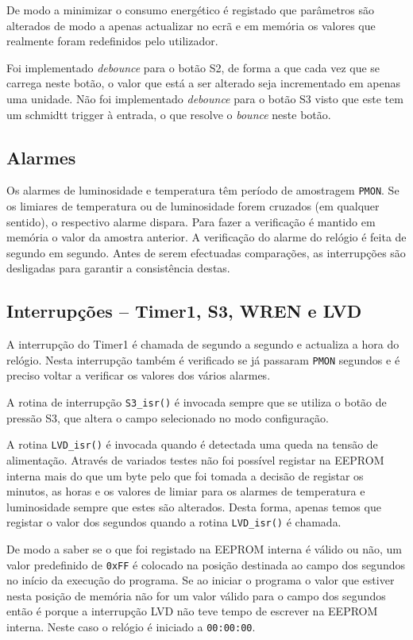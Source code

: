\documentclass[a4paper,12pt]{article}
\begin{document}
De modo a minimizar o consumo energético é registado que parâmetros são alterados de modo a apenas actualizar no ecrã e em memória os valores que realmente foram redefinidos pelo utilizador.

Foi implementado \textit{debounce} para o botão S2, de forma a que cada vez que se carrega neste botão, o valor que está a ser alterado seja incrementado em apenas uma unidade. Não foi implementado \textit{debounce} para o botão S3 visto que este tem um schmidtt trigger à entrada, o que resolve o \textit{bounce} neste botão.


\subsection{Alarmes}

Os alarmes de luminosidade e temperatura têm período de amostragem \texttt{PMON}. Se os limiares de temperatura ou de luminosidade forem cruzados (em qualquer sentido), o respectivo alarme dispara. Para fazer a verificação é mantido em memória o valor da amostra anterior.
A verificação do alarme do relógio é feita de segundo em segundo. Antes de serem efectuadas comparações, as interrupções são desligadas para garantir a consistência destas.

\subsection{Interrupções -- Timer1, S3, WREN e LVD}

A interrupção do Timer1 é chamada de segundo a segundo e actualiza a hora do relógio. Nesta interrupção também é verificado se já passaram \texttt{PMON} segundos e é preciso voltar a verificar os valores dos vários alarmes.

A rotina de interrupção \texttt{S3\_isr()} é invocada sempre que se utiliza o botão de pressão S3, que altera o campo selecionado no modo configuração.

A rotina \texttt{LVD\_isr()} é invocada quando é detectada uma queda na tensão de alimentação. Através de variados testes não foi possível registar na EEPROM interna mais do que um byte pelo que foi tomada a decisão de registar os minutos, as horas e os valores de limiar para os alarmes de temperatura e luminosidade sempre que estes são alterados. Desta forma, apenas temos que registar o valor dos segundos quando a rotina \texttt{LVD\_isr()} é chamada.

De modo a saber se o que foi registado na EEPROM interna é válido ou não, um valor predefinido de \texttt{0xFF} é colocado na posição destinada ao campo dos segundos no início da execução do programa. Se ao iniciar o programa o valor que estiver nesta posição de memória não for um valor válido para o campo dos segundos então é porque a interrupção LVD não teve tempo de escrever na EEPROM interna. Neste caso o relógio é iniciado a \texttt{00:00:00}.
\end{document}
